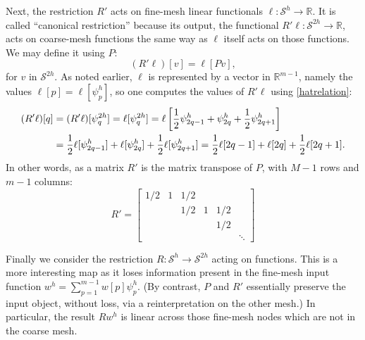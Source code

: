 \documentclass[letterpaper,final,12pt,reqno]{amsart}
\newcommand{\RR}{\mathbb{R}}
\begin{document}
Next, the restriction $R'$ acts on fine-mesh linear functionals $\ell:\mathcal{S}^h \to \RR$.  It is called ``canonical restriction'' \cite{GraeserKornhuber2009} because its output, the functional $R'\ell:\mathcal{S}^{2h}\to \RR$, acts on coarse-mesh functions the same way as $\ell$ itself acts on those functions.  We may define it using $P$:
\begin{equation}
  (R'\ell)[v] = \ell[Pv],  \label{rprimedefinition}
\end{equation}
for $v$ in $\mathcal{S}^{2h}$.  As noted earlier, $\ell$ is represented by a vector in $\RR^{m-1}$, namely the values $\ell[p] = \ell[\psi_p^h]$, so one computes the values of $R'\ell$ using \eqref{hatrelation}:
\begin{align}
  (R'\ell)[q] &= (R'\ell)[\psi_q^{2h}] = \ell[\psi_q^{2h}] = \ell\left[\frac{1}{2} \psi_{2q-1}^h + \psi_{2q}^h + \frac{1}{2} \psi_{2q+1}^h\right]  \label{rprimeformula} \\
      &= \frac{1}{2} \ell[\psi_{2q-1}^h] + \ell[\psi_{2q}^h] + \frac{1}{2} \ell[\psi_{2q+1}^h] = \frac{1}{2} \ell[2q-1] + \ell[2q] + \frac{1}{2} \ell[2q+1].  \notag
\end{align}
In other words, as a matrix $R'$ is the matrix transpose of $P$, with $M-1$ rows and $m-1$ columns:
\begin{equation}
R' = \begin{bmatrix}
1/2 & 1 & 1/2 &   &     & \\
    &   & 1/2 & 1 & 1/2 & \\
    &   &     &   & 1/2 & \\
    &   &     &   &     & \ddots
\end{bmatrix} \label{rprimematrix}
\end{equation}

Finally we consider the restriction $R:\mathcal{S}^h\to\mathcal{S}^{2h}$ acting on functions.  This is a more interesting map as it loses information present in the fine-mesh input function $w^h = \sum_{p=1}^{m-1} w[p] \psi_p^{h}$.  (By contrast, $P$ and $R'$ essentially preserve the input object, without loss, via a reinterpretation on the other mesh.)  In particular, the result $R w^h$ is linear across those fine-mesh nodes which are not in the coarse mesh.
\end{document}
